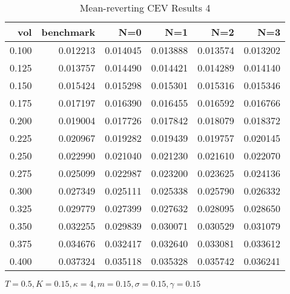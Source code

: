 \begin{table}[ht]
  \centering
  \caption{Mean-reverting CEV Results 4}
  \begin{tabular}{rrrrrr}
  \toprule
    vol &       benchmark &       N=0 &       N=1 &       N=2 &       N=3 \\
  \midrule
  0.100 & 0.012213 & 0.014045 & 0.013888 & 0.013574 & 0.013202 \\
  0.125 & 0.013757 & 0.014490 & 0.014421 & 0.014289 & 0.014140 \\
  0.150 & 0.015424 & 0.015298 & 0.015301 & 0.015316 & 0.015346 \\
  0.175 & 0.017197 & 0.016390 & 0.016455 & 0.016592 & 0.016766 \\
  0.200 & 0.019004 & 0.017726 & 0.017842 & 0.018079 & 0.018372 \\
  0.225 & 0.020967 & 0.019282 & 0.019439 & 0.019757 & 0.020145 \\
  0.250 & 0.022990 & 0.021040 & 0.021230 & 0.021610 & 0.022070 \\
  0.275 & 0.025099 & 0.022987 & 0.023200 & 0.023625 & 0.024136 \\
  0.300 & 0.027349 & 0.025111 & 0.025338 & 0.025790 & 0.026332 \\
  0.325 & 0.029779 & 0.027399 & 0.027632 & 0.028095 & 0.028650 \\
  0.350 & 0.032255 & 0.029839 & 0.030071 & 0.030529 & 0.031079 \\
  0.375 & 0.034676 & 0.032417 & 0.032640 & 0.033081 & 0.033612 \\
  0.400 & 0.037324 & 0.035118 & 0.035328 & 0.035742 & 0.036241 \\
  \bottomrule
  \end{tabular}
  \small{$T=0.5,K=0.15, \kappa = 4,m=0.15, \sigma = 0.15, \gamma = 0.15$}
\end{table}

